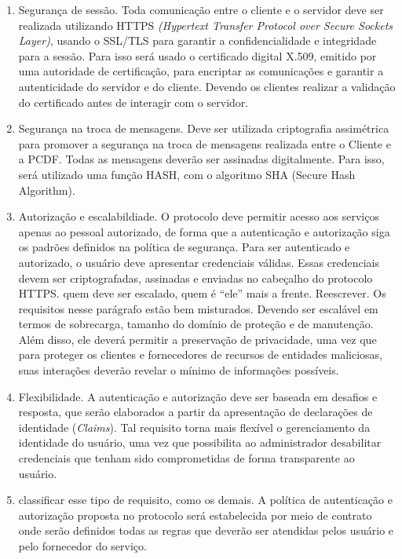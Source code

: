 \begin{enumerate}[RQ1]

\item Segurança de sessão. Toda comunicação entre o cliente e o servidor deve ser realizada utilizando HTTPS \emph{(Hypertext Transfer Protocol over Secure Sockets Layer)}, usando o SSL/TLS para garantir a confidencialidade e integridade para a sessão. Para isso será usado o certificado digital X.509, emitido por uma autoridade de certificação, para encriptar as comunicações e garantir a autenticidade do servidor e do cliente. Devendo os clientes realizar a validação do certificado antes de interagir com o servidor.

\item Seguran\c ca na troca de mensagens. Deve ser utilizada criptografia assimétrica para promover a segurança na troca de mensagens realizada entre o Cliente e a PCDF. Todas as mensagens deverão ser assinadas digitalmente. Para isso, será utilizado uma função HASH, com o algoritmo SHA (Secure Hash Algorithm).

\item Autoriza\c c\~{a}o e escalabildiade. O protocolo deve permitir acesso aos serviços apenas ao pessoal autorizado, de forma que a autenticação e autorização siga os padrões definidos na política de segurança. Para ser autenticado e autorizado, o usuário deve apresentar credenciais válidas. Essas credenciais devem ser criptografadas, assinadas e enviadas no cabeçalho do protocolo HTTPS. {\color{red}quem deve ser escalado, quem \'{e} ``ele'' mais a frente. Reescrever. Os requisitos nesse par\'{a}grafo est\~{a}o bem misturados.} Devendo ser escalável em termos de sobrecarga, tamanho do domínio de proteção e de manutenção. Além disso, ele deverá permitir a preservação de privacidade, uma vez que para proteger os clientes e fornecedores de recursos de entidades maliciosas, suas interações deverão revelar o mínimo de informações possíveis.

\item Flexibilidade. A autenticação e autorização deve ser baseada em desafios e resposta, que serão elaborados a partir da apresentação de declarações de identidade (\emph{Claims}). Tal requisito torna mais flexível o gerenciamento da identidade do usuário, uma vez que possibilita ao administrador desabilitar credenciais que tenham sido comprometidas de forma transparente ao usuário.

\item {\color{red}classificar esse tipo de requisito, como os demais.} A política de autenticação e autorização proposta no protocolo será estabelecida por meio de contrato onde serão definidos todas as regras que deverão ser atendidas pelos usuário e pelo fornecedor do serviço.

\end{enumerate}

